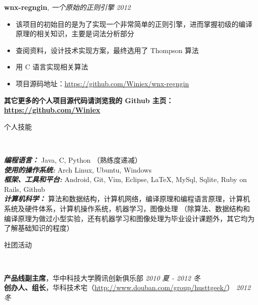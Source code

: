 \documentclass[9pt]{ctexart}
\newenvironment{changemargin}[2]{%
    \begin{list}{}{%
            \setlength{\topsep}{0pt}%
            \setlength{\leftmargin}{#1}%
            \setlength{\rightmargin}{#2}%
            \setlength{\listparindent}{\parindent}%
        \setlength{\itemindent}{\parindent}%
            \setlength{\parsep}{\parskip}%
        }%
  \item[]}{\end{list}
      }
\newcommand{\lineover}{
          \begin{changemargin}{-0.05in}{-0.05in}
              \vspace*{-8pt}
              \hrulefill \\
              \vspace*{-2pt}
          \end{changemargin}
      }
\newcommand{\header}[1]{
          \begin{changemargin}{-0.5in}{-0.5in}
              \scshape{#1}\\
              \lineover
          \end{changemargin}
      }
\newenvironment{body} {
          \vspace*{-16pt}
          \begin{changemargin}{-0.25in}{-0.5in}
          }	
      {\end{changemargin}
      }
\begin{document}
\begin{body}
          \vspace*{-4pt}
          \textbf {wnx-regngin}, \emph{一个原始的正则引擎} \hfill \emph{2012}\\
      \begin{itemize} \itemsep -0pt
              \item 该项目的初始目的是为了实现一个非常简单的正则引擎，进而掌握初级的编译原理的相关知识，主要是词法分析部分
              \item 查阅资料，设计技术实现方案，最终选用了 Thompson 算法
              \item 用 C 语言实现相关算法
              \item 项目源码地址：\url{https://github.com/Winiex/wnx-regngin}
          \end{itemize}

          \vspace*{-4pt}
          \textbf {其它更多的个人项目源代码请浏览我的 Github 主页：\url{https://github.com/Winiex}}
      \end{body}

      \smallskip

      \header{个人技能}

      \begin{body}
          \vspace{14pt}
          \emph{\textbf{编程语言：}}{} Java, C, Python （熟练度递减）\\
          \medskip
          \emph{\textbf{使用的操作系统:}}{} Arch Linux, Ubuntu, Windows \\
          \medskip
          \emph{\textbf{框架、工具和平台:}}{} Android, Git, Vim, Eclipse, \LaTeX, MySql, Sqlite, Ruby on Rails, Github \\
          \medskip
          \emph{\textbf{计算机科学：}}{} 算法和数据结构，计算机网络，编译原理和编程语言原理，计算机系统及硬件体系，计算机操作系统，机器学习，图像处理 （除算法、数据结构和编译原理为做过小型实验，还有机器学习和图像处理为毕业设计课题外，其它均为了解基础知识的程度）

      \end{body}

      \smallskip


      \header{社团活动}

      \begin{body}
          \vspace{14pt}
          \textbf{产品线副主席}，华中科技大学腾讯创新俱乐部 \hfill {} \emph{2010 夏 - 2012 冬}\\
          \textbf{创办人、组长}，华科技术宅（\url{http://www.douban.com/group/husttgeek/}） \hfill {} \emph{2012 冬}\\
      \end{body}
\end{document}
